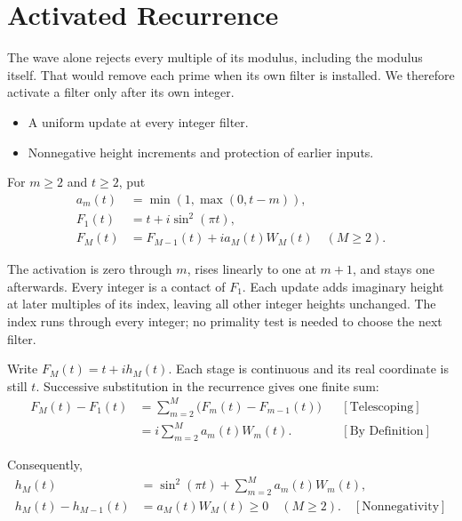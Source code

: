 \section{Activated Recurrence}
The wave alone rejects every multiple of its modulus, including the modulus
itself. That would remove each prime when its own filter is installed. We
therefore activate a filter only after its own integer.

\begin{itemize}
\item A uniform update at every integer filter.
\item Nonnegative height increments and protection of earlier inputs.
\end{itemize}

For $m\ge2$ and $t\ge2$, put
\begin{equation*}
\begin{aligned}
a_m(t)&=\min(1,\max(0,t-m)),\\
F_1(t)&=t+i\sin^2(\pi t),\\
F_M(t)&=F_{M-1}(t)+i a_M(t)W_M(t)\quad(M\ge2).
\end{aligned}
\end{equation*}

The activation is zero through $m$, rises linearly to one at $m+1$, and
stays one afterwards. Every integer is a contact of $F_1$. Each update adds
imaginary height at later multiples of its index, leaving all other integer
heights unchanged. The index runs through every integer; no primality test
is needed to choose the next filter.

Write $F_M(t)=t+i h_M(t)$. Each stage is continuous and its real coordinate
is still $t$. Successive substitution in the recurrence gives one finite sum:
\begin{equation*}
\begin{aligned}
F_M(t)-F_1(t)
&=\sum_{m=2}^{M}\bigl(F_m(t)-F_{m-1}(t)\bigr)
&&[\text{Telescoping}]\\
&=i\sum_{m=2}^{M}a_m(t)W_m(t).
&&[\text{By Definition}]
\end{aligned}
\end{equation*}

Consequently,
\begin{equation*}
\begin{aligned}
h_M(t)&=\sin^2(\pi t)+\sum_{m=2}^{M}a_m(t)W_m(t),\\
h_M(t)-h_{M-1}(t)&=a_M(t)W_M(t)\ge0\quad(M\ge2).
\quad[\text{Nonnegativity}]
\end{aligned}
\end{equation*}

